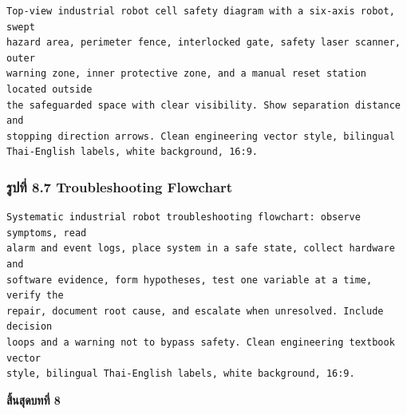 \begin{verbatim}
Top-view industrial robot cell safety diagram with a six-axis robot, swept
hazard area, perimeter fence, interlocked gate, safety laser scanner, outer
warning zone, inner protective zone, and a manual reset station located outside
the safeguarded space with clear visibility. Show separation distance and
stopping direction arrows. Clean engineering vector style, bilingual
Thai-English labels, white background, 16:9.
\end{verbatim}

\subsubsection{รูปที่ 8.7 Troubleshooting Flowchart}

\begin{verbatim}
Systematic industrial robot troubleshooting flowchart: observe symptoms, read
alarm and event logs, place system in a safe state, collect hardware and
software evidence, form hypotheses, test one variable at a time, verify the
repair, document root cause, and escalate when unresolved. Include decision
loops and a warning not to bypass safety. Clean engineering textbook vector
style, bilingual Thai-English labels, white background, 16:9.
\end{verbatim}



\textbf{สิ้นสุดบทที่ 8}
